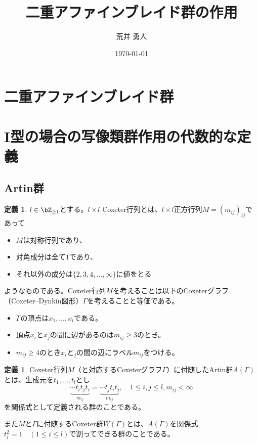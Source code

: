 \documentclass[uplatex, a4paper, dvipdfmx]{jsarticle}
\title{二重アファインブレイド群の作用}
\author{荒井 勇人}
\date{\today}
\theoremstyle{definition}
\newtheorem{definition}[theorem]{定義}
\begin{document}
\maketitle
\section{二重アファインブレイド群}

\section{I型の場合の写像類群作用の代数的な定義}
\subsection{Artin群}
\begin{definition}
    $l \in \bZ_{\geq 1}$とする。$l \times l$ Coxeter行列とは、$l \times l$正方行列$M = (m_{ij})_{ij}$であって
    \begin{itemize}
        \item $M$は対称行列であり、
        \item 対角成分は全て$1$であり、
        \item それ以外の成分は$\{2, 3, 4, \dots, \infty\}$に値をとる
    \end{itemize}
    ようなものである。Coxeter行列$M$を考えることは以下のCoxeterグラフ（Coxeter--Dynkin図形）$\Gamma$を考えることと等価である。
    \begin{itemize}
        \item $\Gamma$の頂点は$x_1, \dots, x_l$である。
        \item 頂点$x_i$と$x_j$の間に辺があるのは$m_{ij} \geq 3$のとき。
        \item $m_{ij}\geq 4$のとき$x_i$と$_j$の間の辺にラベル$m_{ij}$をつける。
    \end{itemize}
\end{definition}
\begin{definition}
    Coxeter行列$M$（と対応するCoxeterグラフ$\Gamma$）に付随したArtin群$A(\Gamma)$とは、生成元を$t_1, \dots, t_l$とし
    \begin{equation}
        \underbrace{\cdots t_i t_j t_i}_{m_{ij}} = \underbrace{\cdots t_j t_i t_j}_{m_{ij}}, \quad 1 \leq i, j \leq l, m_{ij} < \infty
    \end{equation}
    を関係式として定義される群のことである。

    また$M$と$\Gamma$に付随するCoxeter群$W(\Gamma)$とは、$A(\Gamma)$を関係式$t_i^2=1 \quad(1\leq i\leq l)$で割ってできる群のことである。
\end{definition}
\end{document}
